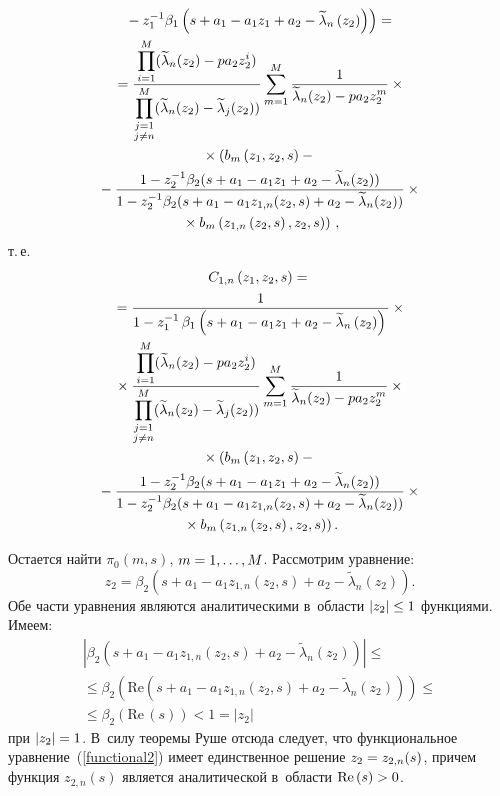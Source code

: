 \begin{multicols}{2}
\begin{multline*}
\left.{}-z_1^{-1}\beta_1
\left(s+a_1-a_1 z_1+a_2-\widetilde{\lambda}_n\left(z_2\right)\right)\right)={}\\
{}=\displaystyle\frac{\displaystyle \prod\limits_{i=1}^M(\widetilde{\lambda}_n(z_2)-pa_2 z_2^i)\mathstrut}{\displaystyle \prod\limits_{\substack{j=1\\j\neq n}}^M(\widetilde{\lambda}_n(z_2)-
\widetilde{\lambda}_j(z_2))\mathstrut}
\sum\limits_{m=1}^M
\displaystyle\frac{\displaystyle 1\mathstrut}{\displaystyle \widetilde{\lambda}_n(z_2)-pa_2 z_2^m\mathstrut}\times{}\\
{}\times\left(b_m\left(z_1,z_2,s\right)-{}\right.\\
{}-
\displaystyle\frac{\displaystyle 1-z_2^{-1}\beta_2(s+a_1-a_1 z_1+a_2-\widetilde{\lambda}_n(z_2))\mathstrut}{\displaystyle 1-z_2^{-1}\beta_2(s+a_1-a_1 z_{1,n}(z_2,s)+a_2-\widetilde{\lambda}_n(z_2))\mathstrut}\times{}\\
\left.{}\times b_m\left(z_{1,n}\left(z_2,s\right),z_2,s\right)\right)\,,
\end{multline*}
т.\,е.\ \\[-17pt]
\begin{multline*}
C_{1,n}\left(z_1,z_2,s\right)={}\\
{}=
\displaystyle\frac{\displaystyle 1\mathstrut}{\displaystyle 1-z_1^{-1}\,\beta_1\left(s+a_1-a_1 z_1+a_2-
\widetilde{\lambda}_n\left(z_2\right)\right)\mathstrut}\times{}\\
{}\times
\displaystyle\frac{\displaystyle \prod\limits_{i=1}^M
(\widetilde{\lambda}_n(z_2)-pa_2 z_2^i)\mathstrut}{\displaystyle \prod\limits_{\substack{j=1\\j\neq n}}^M(\widetilde{\lambda}_n(z_2)-
\widetilde{\lambda}_j(z_2))\mathstrut}
\sum\limits_{m=1}^M
\displaystyle\frac{\displaystyle 1\mathstrut}{\displaystyle \widetilde{\lambda}_n(z_2)-pa_2 z_2^m\mathstrut}\times{}\\
{}\times\left( b_m\left(z_1,z_2,s\right)-{}\right.\\
{}-
\displaystyle\frac{\displaystyle 1-z_2^{-1}\beta_2(s+a_1-a_1 z_1+a_2-\widetilde{\lambda}_n(z_2))\mathstrut}{\displaystyle 1-z_2^{-1}\beta_2(s+a_1-a_1 z_{1,n}(z_2,s)+a_2-\widetilde{\lambda}_n(z_2))\mathstrut}\times{}\\
\left.{}\times b_m\left(z_{1,n}\left(z_2,s\right),z_2,s\right)\right).
\end{multline*}

Остается найти $\pi_0(m,s)$, $m\hm=1,\ldots,M$. Рас\-смот\-рим уравнение:
\begin{equation}
z_2=\beta_2\left(s+a_1-a_1 z_{1,n}\left(z_2,s\right)+
a_2-\widetilde{\lambda}_n\left(z_2\right)\!\right).\!\!
\label{functional2}
\end{equation}
Обе части уравнения являются аналитическими в~области $|z_2|\hm\leq 1$ 
функциями. Имеем:
\begin{multline*}
\left\vert\beta_2\left(s+a_1-a_1 z_{1,n}\left(z_2,s\right)+a_2-
\widetilde{\lambda}_n\left(z_2\right)\right)\right\vert
\leq{}\\
{}\leq\beta_2\left(\mathrm{Re}\left(s+a_1-a_1 z_{1,n}\left(z_2,s\right)+
a_2-\widetilde{\lambda}_n\left(z_2\right)\!\right)\!\right)\leq{}\\
{}\leq\beta_2(\mathrm{Re}\,(s))<1=\left|z_2\right|
\end{multline*}
при $|z_2|\hm=1$. В~силу теоремы Руше отсюда следует, что функциональное 
уравнение~(\ref{functional2}) имеет единственное решение $z_2\hm=z_{2,n}(s)$, 
причем функция $z_{2,n}(s)$ является аналитической в~области $\mathrm{Re}\,(s)\hm>0$.


\end{multicols}
